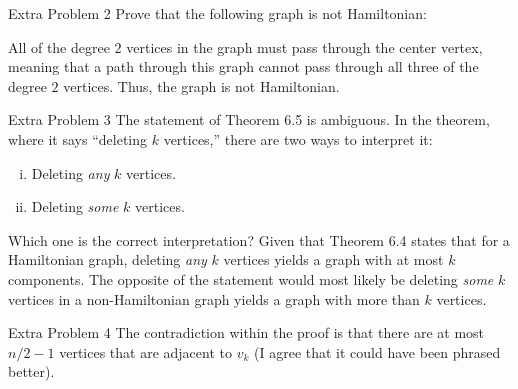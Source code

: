 \documentclass[10pt]{extarticle}
\begin{document}
  \begin{problem}{Extra Problem 2}
    Prove that the following graph is not Hamiltonian:
    \begin{center}
    \end{center}
    \tcblower
    All of the degree $2$ vertices in the graph must pass through the center vertex, meaning that a path through this graph cannot pass through all three of the degree $2$ vertices. Thus, the graph is not Hamiltonian.
  \end{problem}
  \begin{problem}{Extra Problem 3}
    The statement of Theorem 6.5 is ambiguous. In the theorem, where it says ``deleting $k$ vertices,'' there are two ways to interpret it:
    \begin{enumerate}[(i)]
      \item Deleting \textit{any} $k$ vertices.
      \item Deleting \textit{some} $k$ vertices.
    \end{enumerate}
    Which one is the correct interpretation?
    \tcblower
    Given that Theorem 6.4 states that for a Hamiltonian graph, deleting \textit{any} $k$ vertices yields a graph with at most $k$ components. The opposite of the statement would most likely be deleting \textit{some} $k$ vertices in a non-Hamiltonian graph yields a graph with more than $k$ vertices.
  \end{problem}
  \begin{problem}{Extra Problem 4}
    The contradiction within the proof is that there are at most $n/2-1$ vertices that are adjacent to $v_k$ (I agree that it could have been phrased better).
  \end{problem}
\end{document}
